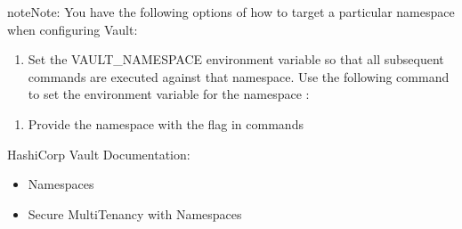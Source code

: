 \documentclass[letterpaper,10pt,english]{sphinxmanual}
\begin{document}
\begin{sphinxadmonition}{note}{Note:}
\sphinxAtStartPar
You have the following options of how to target a particular namespace when configuring Vault:
\begin{enumerate}
%
\item {} 
\sphinxAtStartPar
Set the VAULT\_NAMESPACE environment variable so that all subsequent commands are executed against that namespace. Use the following command to set the environment variable for the namespace :

\end{enumerate}

\begin{sphinxVerbatim}[commandchars=\\\{\}]
\PYGZdl{}  
\end{sphinxVerbatim}
\begin{enumerate}
%
\setcounter{enumi}{1}
\item {} 
\sphinxAtStartPar
Provide the namespace with the  flag in commands

\end{enumerate}
\end{sphinxadmonition}


\nopagebreak


\sphinxAtStartPar
HashiCorp Vault Documentation:
\begin{itemize}
\item {} \begin{description}
\item[{Namespaces}] \leavevmode
\sphinxAtStartPar
{}

\end{description}

\item {} \begin{description}
\item[{Secure Multi\sphinxhyphen{}Tenancy with Namespaces}] \leavevmode
\sphinxAtStartPar
{}

\end{description}

\end{itemize}
\end{document}
